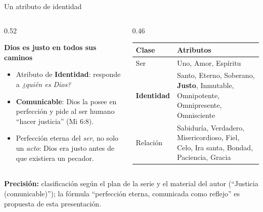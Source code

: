 \documentclass[hyperref={bookmarks=false},aspectratio=169]{beamer}
\newcommand{\destacar}[1]{\textbf{\textcolor{azul}{#1}}}
\newcommand{\precision}[1]{{\footnotesize\color{gris}\textbf{Precisión:} #1}}
\begin{document}
\begin{frame}{Un atributo de identidad}
\begin{columns}[c,onlytextwidth]
\begin{column}{0.52\textwidth}\small
\begin{tcolorbox}[colback=papiro,colframe=dorado,boxrule=1.2pt,arc=3pt]
\centering\textbf{Dios es justo en todos sus caminos}
\end{tcolorbox}
\begin{itemize}
\item Atributo de \destacar{Identidad}: responde a \emph{¿quién es Dios?}
\item \destacar{Comunicable}: Dios la posee en perfección y pide al ser humano ``hacer justicia'' (Mi 6:8).
\item Perfección eterna del \emph{ser}, no solo un \emph{acto}: Dios era justo antes de que existiera un pecador.
\end{itemize}
\end{column}
\begin{column}{0.46\textwidth}
\scriptsize\renewcommand{\arraystretch}{1.2}
\begin{tabular}{@{}>{\RaggedRight\arraybackslash}p{1.9cm}>{\RaggedRight\arraybackslash}p{3.6cm}@{}}
\toprule
\textbf{Clase} & \textbf{Atributos} \\ \midrule
Ser & Uno, Amor, Espíritu \\
\destacar{Identidad} & Santo, Eterno, Soberano, \destacar{Justo}, Inmutable, Omnipotente, Omnipresente, Omnisciente \\
Relación & Sabiduría, Verdadero, Misericordioso, Fiel, Celo, Ira santa, Bondad, Paciencia, Gracia \\
\bottomrule
\end{tabular}
\end{column}
\end{columns}\par\smallskip
\precision{clasificación según el plan de la serie y el material del autor (``Justicia (comunicable)''); la fórmula ``perfección eterna, comunicada como reflejo'' es propuesta de esta presentación.}
\end{frame}
\end{document}
